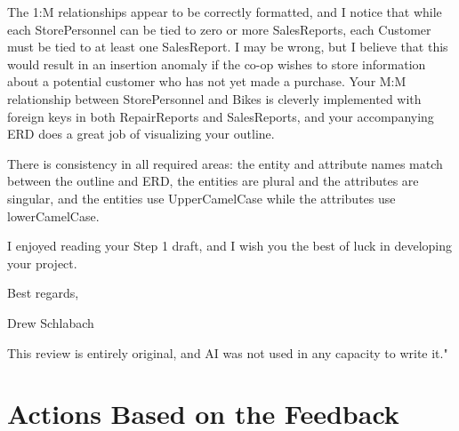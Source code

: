 \documentclass{article}
\begin{document}
\begin{tcolorbox}[colback=secondarycolor, colframe=primarycolor, title=\textbf{Peer Review 3 - Drew Schlabach}]
\vspace{0.2cm}

The 1:M relationships appear to be correctly formatted, and I notice that while each StorePersonnel can be tied to zero or more SalesReports, each Customer must be tied to at least one SalesReport. I may be wrong, but I believe that this would result in an insertion anomaly if the co-op wishes to store information about a potential customer who has not yet made a purchase. Your M:M relationship between StorePersonnel and Bikes is cleverly implemented with foreign keys in both RepairReports and SalesReports, and your accompanying ERD does a great job of visualizing your outline. 

\vspace{0.2cm}

There is consistency in all required areas: the entity and attribute names match between the outline and ERD, the entities are plural and the attributes are singular, and the entities use UpperCamelCase while the attributes use lowerCamelCase. 

\vspace{0.2cm}

I enjoyed reading your Step 1 draft, and I wish you the best of luck in developing your project.

\vspace{0.2cm}

Best regards,

\vspace{0.2cm}

Drew Schlabach

\vspace{0.2cm}

This review is entirely original, and AI was not used in any capacity to write it."
\vspace{0.2cm}
\end{tcolorbox}

\section{Actions Based on the Feedback}
\end{document}
